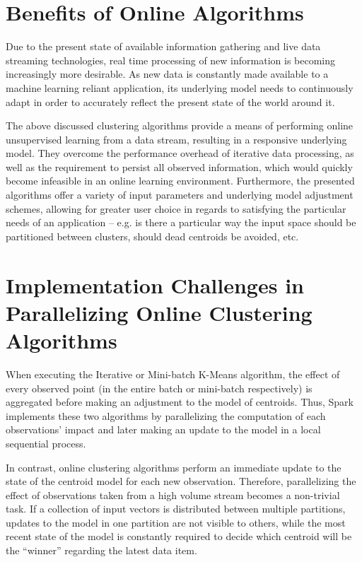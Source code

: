 \documentclass{l4proj}
\begin{document}
\section{Benefits of Online Algorithms}

Due to the present state of available information gathering and live data streaming technologies, real time processing of new information is becoming increasingly more desirable. As new data is constantly made available to a machine learning reliant application, its underlying model needs to continuously adapt in order to accurately reflect the present state of the world around it.

The above discussed clustering algorithms provide a means of performing online unsupervised learning from a data stream, resulting in a responsive underlying model. They overcome the performance overhead of iterative data processing, as well as the requirement to persist all observed information, which would quickly become infeasible in an online learning environment. Furthermore, the presented algorithms offer a variety of input parameters and underlying model adjustment schemes, allowing for greater user choice in regards to satisfying the particular needs of an application -- e.g. is there a particular way the input space should be partitioned between clusters, should dead centroids be avoided, etc. 

\section{Implementation Challenges in Parallelizing Online Clustering Algorithms}

When executing the Iterative or Mini-batch K-Means algorithm, the effect of every observed point (in the entire batch or mini-batch respectively) is aggregated before making an adjustment to the model of centroids. Thus, Spark implements these two algorithms by parallelizing the computation of each observations' impact and later making an update to the model in a local sequential process.

In contrast, online clustering algorithms perform an immediate update to the state of the centroid model for each new observation. Therefore, parallelizing the effect of observations taken from a high volume stream becomes a non-trivial task. If a collection of input vectors is distributed between multiple partitions, updates to the model in one partition are not visible to others, while the most recent state of the model is constantly required to decide which centroid will be the ``winner'' regarding the latest data item.
\end{document}
